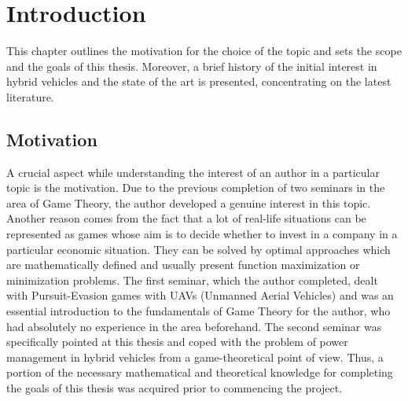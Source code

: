 \chapter{Introduction}
\label{chp:intro}
This chapter outlines the motivation for the choice of the topic and sets the scope and the goals of this thesis. Moreover, a brief history of the initial interest in hybrid vehicles and the state of the art is presented, concentrating on the latest literature.

\section{Motivation}
A crucial aspect while understanding the interest of an author in a particular topic is the motivation. Due to the previous completion of two seminars in the area of Game Theory, the author developed a genuine interest in this topic. Another reason comes from the fact that a lot of real-life situations can be represented as games whose aim is to decide whether to invest in a company in a particular economic situation. They can be solved by optimal approaches which are mathematically defined and usually present function maximization or minimization problems. The first seminar, which the author completed, dealt with Pursuit-Evasion games with UAVs (Unmanned Aerial Vehicles) and was an essential introduction to the fundamentals of Game Theory for the author, who had absolutely no experience in the area beforehand. The second seminar was specifically pointed at this thesis and coped with the problem of power management in hybrid vehicles from a game-theoretical point of view. Thus, a portion of the necessary mathematical and theoretical knowledge for completing the goals of this thesis was acquired prior to commencing the project.

